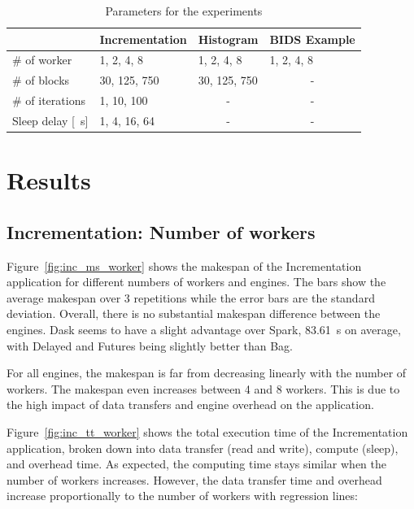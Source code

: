 \documentclass[conference]{IEEEtran}
\begin{document}

\begin{table}[!t]
    \renewcommand{\arraystretch}{1.3}
    \caption{Parameters for the experiments}\label{tab:param}
    \centering
    \begin{tabular*}{\columnwidth}{llll}
    \hline
                        & Incrementation & Histogram             & BIDS Example          \\ \hline
    \# of worker        & 1, 2, 4, 8     & 1, 2, 4, 8            & 1, 2, 4, 8            \\
    \# of blocks        & 30, 125, 750   & 30, 125, 750          & \multicolumn{1}{c}{-} \\
    \# of iterations    & 1, 10, 100     & \multicolumn{1}{c}{-} & \multicolumn{1}{c}{-} \\
    Sleep delay {[}\SI{}{\second}{]} & 1, 4, 16, 64   & \multicolumn{1}{c}{-} & \multicolumn{1}{c}{-} \\ \hline
    \end{tabular*}
    \end{table}






\section{Results}

\subsection{Incrementation: Number of workers}
Figure~\ref{fig:inc_ms_worker} shows the makespan of the Incrementation application
for different numbers of workers and engines. The bars show the average
makespan over 3 repetitions while the error bars are the standard deviation. Overall,
there is no substantial makespan difference between the engines. Dask seems to have a
slight advantage over Spark, \SI{83.61}{\second} on average,
with Delayed and Futures being slightly better than Bag.

For all engines, the makespan is far from decreasing linearly with the
number of workers. The makespan
even increases between 4 and 8 workers. This is due to the high impact of
data transfers and engine overhead on the application. 

Figure~\ref{fig:inc_tt_worker} shows the total execution time of the
Incrementation application, broken down into data transfer (read and
write), compute (sleep), and overhead time. As expected, the computing time
stays similar when the number of workers increases. However, the data
transfer time and overhead increase proportionally to the number of
workers with regression lines:
\end{document}
